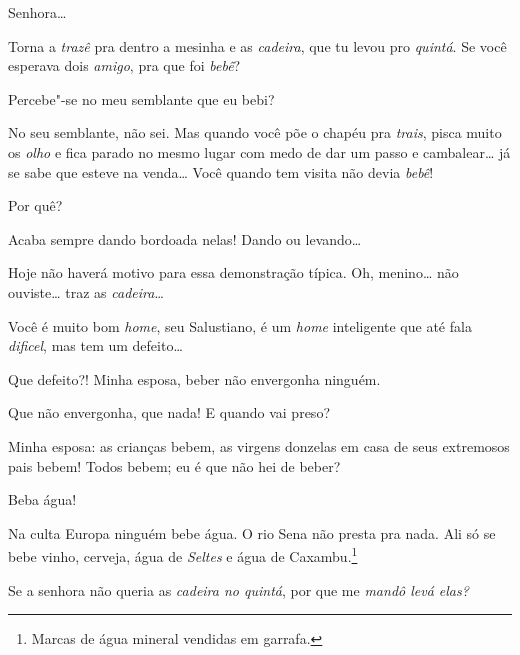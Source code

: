 \begin{linenumbers}
  
Senhora\ldots{} 

 Torna a
\textit{trazê} pra dentro a mesinha e as
\textit{cadeira}, que tu levou pro
\textit{quintá}.  Se
você esperava dois \textit{amigo},
pra que foi \textit{bebê}?

 
Percebe"-se no meu semblante que eu bebi?

 No seu
semblante, não sei. Mas quando você põe o
chapéu pra \textit{trais}, pisca muito os
\textit{olho} e fica parado no mesmo lugar com medo
de dar um passo e cambalear\ldots{} já se sabe que esteve
na venda\ldots{} Você quando tem visita não
devia \textit{bebê}!

 Por
quê?

 Acaba sempre dando bordoada
nelas! Dando ou levando\ldots{}

 Hoje não haverá
motivo para essa demonstração típica.
 Oh,
menino\ldots{} não ouviste\ldots{} traz as
\textit{cadeira}\ldots{}

 Você é muito
bom \textit{home}, seu Salustiano, é um
\textit{home} inteligente que até
fala \textit{dificel}, mas tem um
defeito\ldots{}

 Que defeito?!
Minha esposa, beber não envergonha ninguém.

 Que
não envergonha, que nada! E quando vai preso?

 Minha esposa:
as crianças bebem, as virgens donzelas em casa de
seus extremosos pais bebem! Todos bebem; eu é que
não hei de beber?

 Beba
água!

 Na culta Europa
ninguém bebe água. O rio Sena não
presta pra nada. Ali só se bebe vinho,
cerveja, água de \textit{Seltes} e
água de Caxambu.\footnote{ 
Marcas de água mineral vendidas em garrafa.}




  Se a senhora
não queria as \textit{cadeira no
quintá}, por que me \textit{mandô
levá elas?} 


\end{linenumbers}
